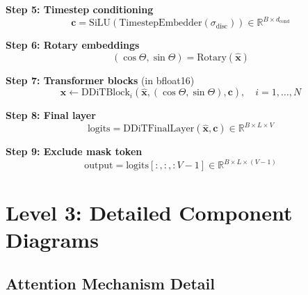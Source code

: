 \documentclass[11pt,a4paper]{article}
\begin{document}
\noindent\textbf{Step 5: Timestep conditioning}
\[
\mathbf{c} = \text{SiLU}\!\left(\text{TimestepEmbedder}(\sigma_{\text{disc}})\right) \in \mathbb{R}^{B \times d_{\text{cond}}}
\]

\noindent\textbf{Step 6: Rotary embeddings}
\[
(\cos\Theta, \sin\Theta) = \text{Rotary}(\hat{\mathbf{x}})
\]

\noindent\textbf{Step 7: Transformer blocks} (in bfloat16)
\[
\hat{\mathbf{x}} \leftarrow \text{DDiTBlock}_i(\hat{\mathbf{x}}, (\cos\Theta, \sin\Theta), \mathbf{c}), \quad i = 1, \ldots, N
\]

\noindent\textbf{Step 8: Final layer}
\[
\text{logits} = \text{DDiTFinalLayer}(\hat{\mathbf{x}}, \mathbf{c}) \in \mathbb{R}^{B \times L \times V}
\]

\noindent\textbf{Step 9: Exclude mask token}
\[
\text{output} = \text{logits}[:, :, :V{-}1] \in \mathbb{R}^{B \times L \times (V{-}1)}
\]

\newpage

\section{Level 3: Detailed Component Diagrams}

\subsection{Attention Mechanism Detail}
\end{document}
